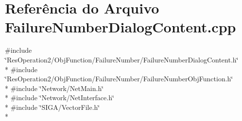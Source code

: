 \section{Referência do Arquivo Failure\+Number\+Dialog\+Content.\+cpp}
\label{_2_obj_function_2_failure_number_2_failure_number_dialog_content_8cpp}
{\ttfamily \#include \char`\"{}Res\+Operation2/\+Obj\+Function/\+Failure\+Number/\+Failure\+Number\+Dialog\+Content.\+h\char`\"{}}\\*
{\ttfamily \#include \char`\"{}Res\+Operation2/\+Obj\+Function/\+Failure\+Number/\+Failure\+Number\+Obj\+Function.\+h\char`\"{}}\\*
{\ttfamily \#include \char`\"{}Network/\+Net\+Main.\+h\char`\"{}}\\*
{\ttfamily \#include \char`\"{}Network/\+Net\+Interface.\+h\char`\"{}}\\*
{\ttfamily \#include \char`\"{}S\+I\+G\+A/\+Vector\+File.\+h\char`\"{}}\\*
